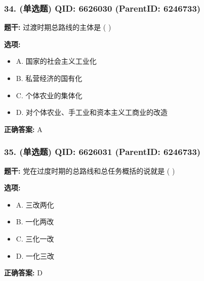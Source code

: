 \documentclass[12pt,UTF8]{ctexart}
\begin{document}
\vspace{0.3em}\hrulefill\vspace{0.7em}

\subsubsection*{34. (单选题) \small QID: 6626030 (ParentID: 6246733)}

\textbf{题干:}
过渡时期总路线的主体是  ( )



\textbf{选项:}
\begin{itemize}[leftmargin=*]

  \item A. 国家的社会主义工业化

  \item B. 私营经济的国有化

  \item C. 个体农业的集体化

  \item D. 对个体农业、手工业和资本主义工商业的改造

\end{itemize}

\textbf{正确答案:}
A

\vspace{0.3em}\hrulefill\vspace{0.7em}

\subsubsection*{35. (单选题) \small QID: 6626031 (ParentID: 6246733)}

\textbf{题干:}
党在过度时期的总路线和总任务概括的说就是  ( )



\textbf{选项:}
\begin{itemize}[leftmargin=*]

  \item A. 三改两化

  \item B. 一化两改

  \item C. 三化一改

  \item D. 一化三改

\end{itemize}

\textbf{正确答案:}
D

\vspace{0.3em}\hrulefill\vspace{0.7em}
\end{document}
